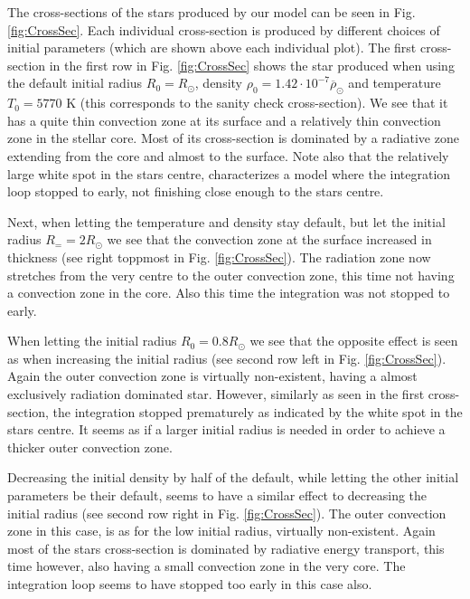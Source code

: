 \documentclass{emulateapj}
\begin{document}
	The cross-sections of the stars produced by our model can be seen in Fig. \ref{fig:CrossSec}. Each individual cross-section is produced by different choices of initial parameters (which are shown above each individual plot). The first cross-section in the first row in Fig. \ref{fig:CrossSec} shows the star produced when using the default initial radius $R_0 = R_\odot$, density $\rho_0 = 1.42\cdot 10^{-7}\overline{\rho}_\odot$ and temperature $T_0 = 5770$ K (this corresponds to the sanity check cross-section). We see that it has a quite thin convection zone at its surface and a relatively thin convection zone in the stellar core. Most of its cross-section is dominated by a radiative zone extending from the core and almost to the surface. Note also that the relatively large white spot in the stars centre, characterizes a model where the integration loop stopped to early, not finishing close enough to the stars centre.
	
	Next, when letting the temperature and density stay default, but let the initial radius $R_= = 2R_\odot$ we see that the convection zone at the surface increased in thickness (see right toppmost in Fig. \ref{fig:CrossSec}). The radiation zone now stretches from the very centre to the outer convection zone, this time not having a convection zone in the core. Also this time the integration was not stopped to early.
	
	When letting the initial radius $R_0 = 0.8 R_\odot$ we see that the opposite effect is seen as when increasing the initial radius (see second row left in Fig. \ref{fig:CrossSec}). Again the outer convection zone is virtually non-existent, having a almost exclusively radiation dominated star. However, similarly as seen in the first cross-section, the integration stopped prematurely as indicated by the white spot in the stars centre. It seems as if a larger initial radius is needed in order to achieve a thicker outer convection zone.
	
	Decreasing the initial density by half of the default, while letting the other initial parameters be their default, seems to have a similar effect to decreasing the initial radius (see second row right in Fig. \ref{fig:CrossSec}). The outer convection zone in this case, is as for the low initial radius, virtually non-existent. Again most of the stars cross-section is dominated by radiative energy transport, this time however, also having a small convection zone in the very core. The integration loop seems to have stopped too early in this case also.
	
\end{document}
